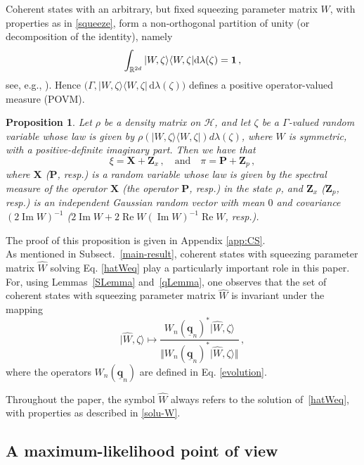 \documentclass[12pt]{article}
\newtheorem{proposition}[theorem]{Proposition}
\newcommand{\ket}[1]{|{#1}\rangle}
\newcommand{\bra}[1]{\langle{#1}|}
\renewcommand{\Re}{\operatorname{Re}}
\renewcommand{\Im}{\operatorname{Im}}
\renewcommand{\d}{{\mathrm d}}
\begin{document}
Coherent states with an arbitrary, but fixed squeezing parameter matrix $W$, with properties as in \eqref{squeeze}, form a non-orthogonal partition of unity (or decomposition of the identity), namely
\begin{equation}
\label{coherent_identity}
\int_{\mathbb{R}^{2d}} \ket{W, \zeta}\bra{W, \zeta} \d\lambda(\zeta) = {\bf{1}}\,,
\end{equation}
 see, e.g., \cite[Theorem 8.85]{DerezinskiGerard}). Hence $\big(\Gamma, \ket{W, \zeta}\bra{W, \zeta}\,\d\lambda(\zeta)\big)$  defines a positive operator-valued measure (POVM). 
 
\begin{proposition}\label{prop:characterization_coherent_POVM}
	Let $\rho$ be a density matrix on $\mathcal{H}$, and let $\zeta$ be a $\Gamma$-valued random variable whose 
	law is given by $\rho(\ket{ W,\zeta}\bra{ W,\zeta})d\lambda(\zeta)$, where $W$ is symmetric, with a 
	positive-definite imaginary part. Then we have that
	$$\xi=\mathbf{X} +\mathbf Z_x\,, \quad \text{and}  \quad \pi=\mathbf{P} + \mathbf Z_p\,,$$
where $\mathbf{X}$ ($\mathbf{P}$, resp.) is a random variable whose law is given by the spectral measure of the operator 
$\mathbf X$ (the operator $\mathbf P$, resp.) in the state $\rho$, and $\mathbf Z_x$ ($\mathbf Z_p$, resp.) is an independent 
Gaussian random vector with mean $0$ and covariance $(2\Im W)^{-1}$ ($2\Im W + 2\Re W(\Im W)^{-1}\Re W$, resp.).
\end{proposition}
The proof of this proposition is given in Appendix \ref{app:CS}.\\

As mentioned in Subsect.~\ref{main-result}, coherent states with squeezing parameter matrix $\widehat{W}$ solving Eq. \eqref{hatWeq} play a particularly important role in this paper. For, using Lemmas~\ref{SLemma} and~\ref{qLemma}, one observes that the set of coherent states with squeezing parameter matrix $\widehat W$ is invariant under the mapping 
$$\ket{\widehat W,\zeta}\mapsto \frac{W_{n}(\underline{\mathbf{q}}_{n})^{*}\ket{\widehat W,\zeta}}{\Vert W_{n}(\underline{\mathbf{q}}_{n})^{*}\ket{\widehat W,\zeta} \Vert }\,,$$
 where the operators 
$W_{n}(\underline{\mathbf{q}}_{n})$ are defined in Eq. \eqref{evolution}.

Throughout the paper, the symbol $\widehat W$ always refers to the solution of~\eqref{hatWeq}, with properties as described in \eqref{solu-W}.

\subsection{A maximum-likelihood point of view}\label{max-likelyhood}
\end{document}

